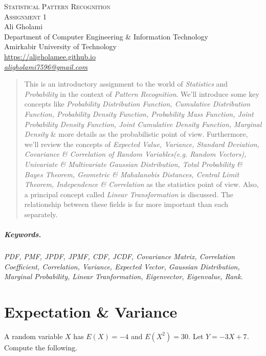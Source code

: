 \documentclass[12pt]{article}
\numberwithin{equation}{section}
\numberwithin{table}{section}
\numberwithin{figure}{section}
\begin{document}

\begin{center}
\textsc{\Large Statistical Pattern Recognition} \\[2pt]
	\textsc{\large Assignment 1}\\
	\vspace{0.5cm}
  Ali Gholami \\[6pt]
  Department of Computer Engineering \& Information Technology\\
  Amirkabir University of Technology  \\[6pt]
  \def\UrlFont{\em}
  \url{https://aligholamee.github.io}\\
    \href{mailto:aligholami7596@gmail.com}{\textit{aligholami7596@gmail.com}}
\end{center}

\begin{abstract}
This is an introductory assignment to the world of \textit{Statistics} and \textit{Probability} in the context of \textit{Pattern Recognition}. We'll introduce some key concepts like \textit{Probability Distribution Function, Cumulative Distribution Function, Probability Density Function, Probability Mass Function, Joint Probability Density Function, Joint Cumulative Density Function, Marginal Density} \& more details as the probabilistic point of view. Furthermore, we'll review the concepts of \textit{Expected Value, Variance, Standard Deviation, Covariance \& Correlation of Random Variables(e.g. Random Vectors), Univariate \& Multivariate Gaussian Distribution, Total Probability \& Bayes Theorem, Geometric \& Mahalanobis Distances, Central Limit Theorem, Independence \& Correlation} as the statistics point of view. Also, a principal concept called \textit{Linear Transformation} is discussed. The relationship between these fields is far more important than each separately.
\end{abstract}

\subparagraph{Keywords.} \textit{PDF, PMF, JPDF, JPMF, CDF, JCDF, Covariance Matrix, Correlation Coefficient, Correlation, Variance, Expected Vector, Gaussian Distribution, Marginal Probability, Linear Tranformation, Eigenvector, Eigenvalue, Rank.}

\section{Expectation \& Variance}

A random variable \textit{$X$} has \textit{$E(X) = -4$} and \textit{$E(X^2) = 30$.} Let \textit{$Y = -3X + 7$.} Compute the following.
\end{document}
